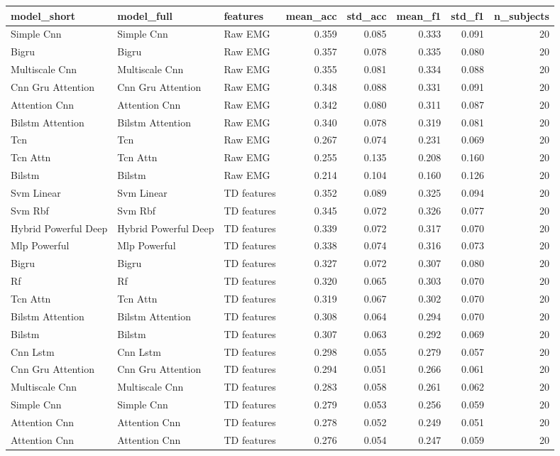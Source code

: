 \begin{tabular}{lllrrrrr}
\toprule
model_short & model_full & features & mean_acc & std_acc & mean_f1 & std_f1 & n_subjects \\
\midrule
Simple Cnn & Simple Cnn & Raw EMG & 0.359 & 0.085 & 0.333 & 0.091 & 20 \\
Bigru & Bigru & Raw EMG & 0.357 & 0.078 & 0.335 & 0.080 & 20 \\
Multiscale Cnn & Multiscale Cnn & Raw EMG & 0.355 & 0.081 & 0.334 & 0.088 & 20 \\
Cnn Gru Attention & Cnn Gru Attention & Raw EMG & 0.348 & 0.088 & 0.331 & 0.091 & 20 \\
Attention Cnn & Attention Cnn & Raw EMG & 0.342 & 0.080 & 0.311 & 0.087 & 20 \\
Bilstm Attention & Bilstm Attention & Raw EMG & 0.340 & 0.078 & 0.319 & 0.081 & 20 \\
Tcn & Tcn & Raw EMG & 0.267 & 0.074 & 0.231 & 0.069 & 20 \\
Tcn Attn & Tcn Attn & Raw EMG & 0.255 & 0.135 & 0.208 & 0.160 & 20 \\
Bilstm & Bilstm & Raw EMG & 0.214 & 0.104 & 0.160 & 0.126 & 20 \\
Svm Linear & Svm Linear & TD features & 0.352 & 0.089 & 0.325 & 0.094 & 20 \\
Svm Rbf & Svm Rbf & TD features & 0.345 & 0.072 & 0.326 & 0.077 & 20 \\
Hybrid Powerful Deep & Hybrid Powerful Deep & TD features & 0.339 & 0.072 & 0.317 & 0.070 & 20 \\
Mlp Powerful & Mlp Powerful & TD features & 0.338 & 0.074 & 0.316 & 0.073 & 20 \\
Bigru & Bigru & TD features & 0.327 & 0.072 & 0.307 & 0.080 & 20 \\
Rf & Rf & TD features & 0.320 & 0.065 & 0.303 & 0.070 & 20 \\
Tcn Attn & Tcn Attn & TD features & 0.319 & 0.067 & 0.302 & 0.070 & 20 \\
Bilstm Attention & Bilstm Attention & TD features & 0.308 & 0.064 & 0.294 & 0.070 & 20 \\
Bilstm & Bilstm & TD features & 0.307 & 0.063 & 0.292 & 0.069 & 20 \\
Cnn Lstm & Cnn Lstm & TD features & 0.298 & 0.055 & 0.279 & 0.057 & 20 \\
Cnn Gru Attention & Cnn Gru Attention & TD features & 0.294 & 0.051 & 0.266 & 0.061 & 20 \\
Multiscale Cnn & Multiscale Cnn & TD features & 0.283 & 0.058 & 0.261 & 0.062 & 20 \\
Simple Cnn & Simple Cnn & TD features & 0.279 & 0.053 & 0.256 & 0.059 & 20 \\
Attention Cnn & Attention Cnn & TD features & 0.278 & 0.052 & 0.249 & 0.051 & 20 \\
Attention Cnn & Attention Cnn & TD features & 0.276 & 0.054 & 0.247 & 0.059 & 20 \\
\bottomrule
\end{tabular}
